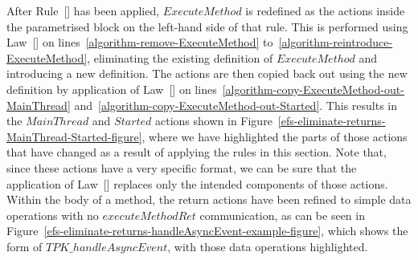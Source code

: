 After Rule~[] has been applied,
$ExecuteMethod$ is redefined as the actions inside the parametrised
block on the left-hand side of that rule.
This is performed using Law~[] on
lines~\ref{algorithm-remove-ExecuteMethod}
to~\ref{algorithm-reintroduce-ExecuteMethod}, eliminating the existing
definition of $ExecuteMethod$ and introducing a new definition.
The actions are then copied back out using the new definition by
application of Law~[] on
lines~\ref{algorithm-copy-ExecuteMethod-out-MainThread}
and~\ref{algorithm-copy-ExecuteMethod-out-Started}.
This results in the $MainThread$ and $Started$ actions shown in
Figure~\ref{efs-eliminate-returns-MainThread-Started-figure}, where we
have highlighted the parts of those actions that have changed as a
result of applying the rules in this section.
Note that, since these actions have a very specific format, we can be
sure that the application of Law~[] replaces
only the intended components of those actions.
Within the body of a method, the return actions have been refined to
simple data operations with no $executeMethodRet$ communication, as
can be seen in
Figure~\ref{efs-eliminate-returns-handleAsyncEvent-example-figure},
which shows the form of $TPK\_handleAsyncEvent$, with those data
operations highlighted.

